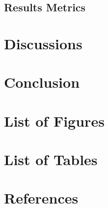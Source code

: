 \documentclass[11pt]{article}
\begin{document}
        \subsection{Results Metrics}
    
    \FloatBarrier
    \section{Discussions}

    \FloatBarrier
    \section{Conclusion}

    \appendix
	\section{List of Figures}
		\makeatletter
		\makeatother

	\section{List of Tables}
		\makeatletter
		\makeatother
    
    \section{References}
\end{document}

